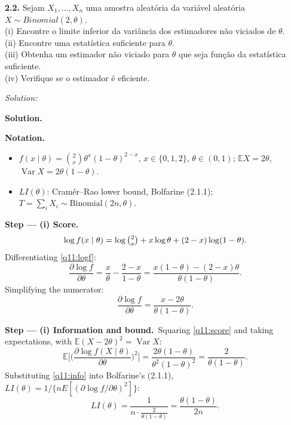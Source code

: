 \documentclass[11pt,a4paper]{article}
\newif\ifsolucoes
\newcommand{\espacoresol}{4.5cm}   %
\numberwithin{equation}{questao}   %
\newenvironment{notacao}{\par\smallskip\noindent\textbf{Notation.}\begin{itemize}[leftmargin=1.4em,topsep=1pt,itemsep=0pt]\small}{\end{itemize}}
\newcommand{\resolespaco}{\ifsolucoes\else\par\textit{Solution:}\vspace{\espacoresol}\par\fi}
\newcommand{\passo}[2]{\par\smallskip\noindent\textbf{Step --- #1.}~#2}
\newcommand{\solhead}{\par\medskip\noindent{\color{blue!55!black}\rule{\linewidth}{0.3pt}}\par\noindent\textbf{Solution.}}
\newcommand{\E}{\mathbb{E}}
\newcommand{\Var}{\operatorname{Var}}
\begin{document}
\begin{otherlanguage}{brazil}
\textbf{2.2.} Sejam $X_1,\dots,X_n$ uma amostra aleatória da variável aleatória
$X\sim\mathit{Binomial}(2,\theta)$.\\
(i) Encontre o limite inferior da variância dos estimadores não viciados de $\theta$.\\
(ii) Encontre uma estatística suficiente para $\theta$.\\
(iii) Obtenha um estimador não viciado para $\theta$ que seja função da estatística suficiente.\\
(iv) Verifique se o estimador é eficiente.
\end{otherlanguage}
\resolespaco
\begin{sol}
\solhead
\begin{notacao}
\item $f(x\mid\theta)=\binom2x\theta^x(1-\theta)^{2-x}$, $x\in\{0,1,2\}$, $\theta\in(0,1)$;
  $\E X=2\theta$, $\Var X=2\theta(1-\theta)$.
\item $LI(\theta)$: Cramér--Rao lower bound, Bolfarine (2.1.1); $T=\sum_iX_i\sim\text{Binomial}(2n,\theta)$.
\end{notacao}

\passo{(i) Score}{}
\begin{equation}\label{q11:logf}
\log f(x\mid\theta)=\log\tbinom2x+x\log\theta+(2-x)\log(1-\theta).
\end{equation}
Differentiating \eqref{q11:logf}:
\[
\frac{\partial\log f}{\partial\theta}=\frac x\theta-\frac{2-x}{1-\theta}
=\frac{x(1-\theta)-(2-x)\theta}{\theta(1-\theta)} .
\]
Simplifying the numerator:
\begin{equation}\label{q11:score}
\frac{\partial\log f}{\partial\theta}=\frac{x-2\theta}{\theta(1-\theta)}.
\end{equation}

\passo{(i) Information and bound}{Squaring \eqref{q11:score} and taking expectations, with $\E(X-2\theta)^2=\Var X$:}
\begin{equation}\label{q11:info}
\E\Big[\Big(\frac{\partial\log f(X\mid\theta)}{\partial\theta}\Big)^2\Big]=\frac{2\theta(1-\theta)}{\theta^2(1-\theta)^2}=\frac{2}{\theta(1-\theta)}.
\end{equation}
Substituting \eqref{q11:info} into Bolfarine's (2.1.1), $LI(\theta)=1/\{nE[(\partial\log f/\partial\theta)^2]\}$:
\begin{equation}\label{q11:LI}
LI(\theta)=\frac{1}{n\cdot\frac{2}{\theta(1-\theta)}}=\frac{\theta(1-\theta)}{2n}.
\end{equation}


\end{sol}
\end{document}
